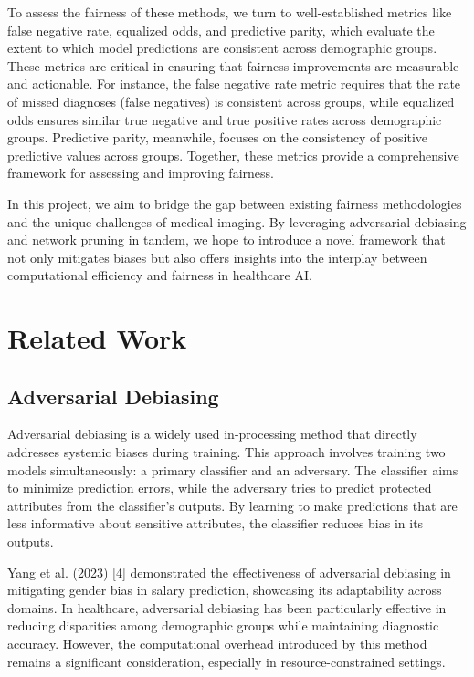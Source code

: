 \documentclass[11pt]{article}
\begin{document}
To assess the fairness of these methods, we turn to well-established metrics like false negative rate, equalized odds, and predictive parity, which evaluate the extent to which model predictions are consistent across demographic groups. These metrics are critical in ensuring that fairness improvements are measurable and actionable. For instance, the false negative rate metric requires that the rate of missed diagnoses (false negatives) is consistent across groups, while equalized odds ensures similar true negative and true positive rates across demographic groups. Predictive parity, meanwhile, focuses on the consistency of positive predictive values across groups. Together, these metrics provide a comprehensive framework for assessing and improving fairness.

In this project, we aim to bridge the gap between existing fairness methodologies and the unique challenges of medical imaging. By leveraging adversarial debiasing and network pruning in tandem, we hope to introduce a novel framework that not only mitigates biases but also offers insights into the interplay between computational efficiency and fairness in healthcare AI.


\section{Related Work}

\subsection{Adversarial Debiasing}

Adversarial debiasing is a widely used in-processing method that directly addresses systemic biases during training. This approach involves training two models simultaneously: a primary classifier and an adversary. The classifier aims to minimize prediction errors, while the adversary tries to predict protected attributes from the classifier's outputs. By learning to make predictions that are less informative about sensitive attributes, the classifier reduces bias in its outputs.

Yang et al. (2023) [4] demonstrated the effectiveness of adversarial debiasing in mitigating gender bias in salary prediction, showcasing its adaptability across domains. In healthcare, adversarial debiasing has been particularly effective in reducing disparities among demographic groups while maintaining diagnostic accuracy. However, the computational overhead introduced by this method remains a significant consideration, especially in resource-constrained settings.
\end{document}
